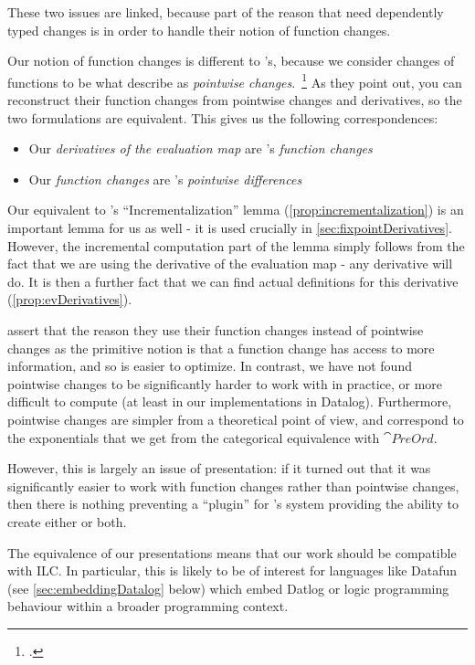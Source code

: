 These two issues are linked, because part of the reason that \citeauthor{cai2014changes} need
dependently typed changes is in order to handle their notion of function
changes.

Our notion of function changes is different to \citeauthor{cai2014changes}'s,
because we consider changes of functions to be what \citeauthor{cai2014changes} describe as
\textit{pointwise changes}.~\footcite[See][section 2.2]{cai2014changes} As they point out, you can reconstruct their
function changes from pointwise changes and derivatives, so the two formulations
are equivalent. This gives us the following correspondences:
\begin{itemize}
  \item Our \textit{derivatives of the
      evaluation map} are \citeauthor{cai2014changes}'s \textit{function changes}
  \item Our \textit{function changes} are \citeauthor{cai2014changes}'s \textit{pointwise differences}
\end{itemize}

Our equivalent to \citeauthor{cai2014changes}'s ``Incrementalization'' lemma
(\cref{prop:incrementalization}) is an important lemma for us as well - it is used
crucially in \cref{sec:fixpointDerivatives}. However, the incremental computation part of
the lemma simply follows from the fact that we are using the derivative of the
evaluation map - any derivative will do. It is then a further fact that we can
find actual definitions for this derivative (\cref{prop:evDerivatives}).

\citeauthor{cai2014changes} assert that the reason they use their function changes instead of pointwise
changes as the primitive notion is that a function change has access to more
information, and so is easier to optimize. In contrast, we have not found pointwise changes to be
significantly harder to work with in practice, or more difficult to compute (at least in our implementations
in Datalog). Furthermore, pointwise changes are simpler from a theoretical point of view, and correspond to the
exponentials that we get from the categorical equivalence with $\cat{PreOrd}$. 

However, this is largely an issue of presentation: if it turned out that it was
significantly easier to work with function changes rather than pointwise
changes, then there is nothing preventing a ``plugin'' for \citeauthor{cai2014changes}'s system providing the
ability to create either or both.

The equivalence of our presentations means that our work should be compatible
with ILC. In particular, this is likely to be of interest for languages like
Datafun (see \cref{sec:embeddingDatalog} below) which embed Datlog or logic programming behaviour within a broader
programming context.

